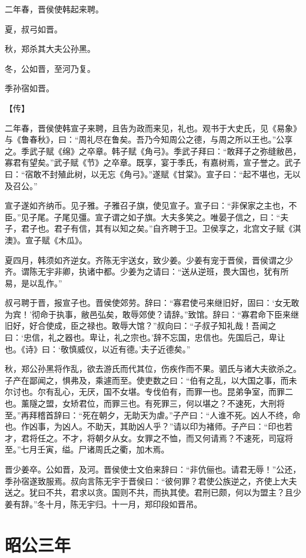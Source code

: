 \documentclass[a4paper,12pt,UTF8,twoside]{ctexbook}
\begin{document}
二年春，晋侯使韩起来聘。

夏，叔弓如晋。

秋，郑杀其大夫公孙黑。

冬，公如晋，至河乃复。

季孙宿如晋。

【传】

二年春，晋侯使韩宣子来聘，且告为政而来见，礼也。观书于大史氏，见《易象》与《鲁春秋》，曰：“周礼尽在鲁矣。吾乃今知周公之德，与周之所以王也。”公享之。季武子赋《绵》之卒章。韩子赋《角弓》。季武子拜曰：“敢拜子之弥缝敝邑，寡君有望矣。”武子赋《节》之卒章。既享，宴于季氏，有嘉树焉，宣子誉之。武子曰：“宿敢不封殖此树，以无忘《角弓》。”遂赋《甘棠》。宣子曰：“起不堪也，无以及召公。”

宣子遂如齐纳币。见子雅。子雅召子旗，使见宣子。宣子曰：“非保家之主也，不臣。”见子尾。子尾见彊。宣子谓之如子旗。大夫多笑之。唯晏子信之，曰：“夫子，君子也。君子有信，其有以知之矣。”自齐聘于卫。卫侯享之，北宫文子赋《淇澳》。宣子赋《木瓜》。

夏四月，韩须如齐逆女。齐陈无宇送女，致少姜。少姜有宠于晋侯，晋侯谓之少齐。谓陈无宇非卿，执诸中都。少姜为之请曰：“送从逆班，畏大国也，犹有所易，是以乱作。”

叔弓聘于晋，报宣子也。晋侯使郊劳。辞曰：“寡君使弓来继旧好，固曰：‘女无敢为宾！’彻命于执事，敝邑弘矣，敢辱郊使？请辞。”致馆。辞曰：“寡君命下臣来继旧好，好合使成，臣之禄也。敢辱大馆？”叔向曰：“子叔子知礼哉！吾闻之曰：‘忠信，礼之器也。卑让，礼之宗也。’辞不忘国，忠信也。先国后己，卑让也。《诗》曰：‘敬慎威仪，以近有德。’夫子近德矣。”

秋，郑公孙黑将作乱，欲去游氏而代其位，伤疾作而不果。驷氏与诸大夫欲杀之。子产在鄙闻之，惧弗及，乘遽而至。使吏数之曰：“伯有之乱，以大国之事，而未尔讨也。尔有乱心，无厌，国不女堪。专伐伯有，而罪一也。昆弟争室，而罪二也。薰隧之盟，女矫君位，而罪三也。有死罪三，何以堪之？不速死，大刑将至。”再拜稽首辞曰：“死在朝夕，无助天为虐。”子产曰：“人谁不死。凶人不终，命也。作凶事，为凶人。不助天，其助凶人乎？”请以印为褚师。子产曰：“印也若才，君将任之。不才，将朝夕从女。女罪之不恤，而又何请焉？不速死，司寇将至。”七月壬寅，缢。尸诸周氏之衢，加木焉。

晋少姜卒。公如晋，及河。晋侯使士文伯来辞曰：“非伉俪也。请君无辱！”公还，季孙宿遂致服焉。叔向言陈无宇于晋侯曰：“彼何罪？君使公族逆之，齐使上大夫送之。犹曰不共，君求以贪。国则不共，而执其使。君刑已颇，何以为盟主？且少姜有辞。”冬十月，陈无宇归。十一月，郑印段如晋吊。


\section{昭公三年}
\end{document}
